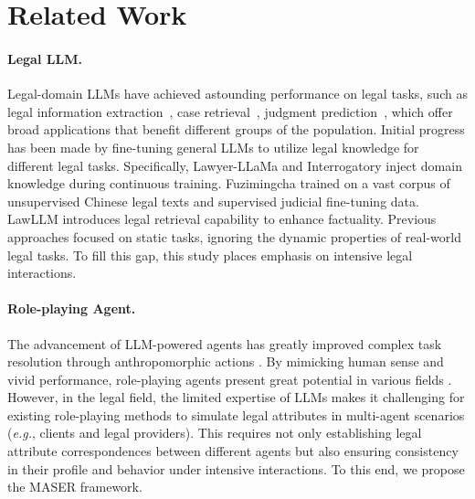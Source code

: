 \section{Related Work}
\paragraph{Legal LLM.}
Legal-domain LLMs have achieved astounding performance on legal tasks, such as legal information extraction~\cite{bommarito2018lexnlp}, case retrieval~\cite{ma2021lecard}, judgment prediction~\cite{huang2021dependency}, 
which offer broad applications that benefit different groups of the population.
Initial progress \cite{lawyerllama,yue2024lawllm,deng2023syllogistic} has been made by fine-tuning general LLMs to utilize legal knowledge for different legal tasks.
Specifically, Lawyer-LLaMa \cite{lawyerllama} and Interrogatory inject domain knowledge during continuous training. 
Fuzimingcha trained on a vast corpus of unsupervised Chinese legal texts and supervised judicial fine-tuning data.
LawLLM \cite{yue2023disc,yue2024lawllm} introduces legal retrieval capability to enhance factuality.
Previous approaches focused on static tasks, ignoring the dynamic properties of real-world legal tasks. To fill this gap, this study places emphasis on intensive legal interactions.


\paragraph{Role-playing Agent.}
The advancement of LLM-powered agents has greatly improved complex task resolution through anthropomorphic actions \cite{park2023generative,fan2024ai,yue2024synergistic}.
By mimicking human sense and vivid performance, role-playing agents present great potential in various fields \cite{mou2024agentsense,gao2024fine,lyu2024human,liu2024ai}.
However, in the legal field, the limited expertise of LLMs makes it challenging for existing role-playing methods \cite{xie2024can,jiang2024evaluating} to simulate legal attributes in multi-agent scenarios (\textit{e.g.}, clients and legal providers). This requires not only establishing legal attribute correspondences between different agents but also ensuring consistency in their profile and behavior under intensive interactions. To this end, we propose the MASER framework.


